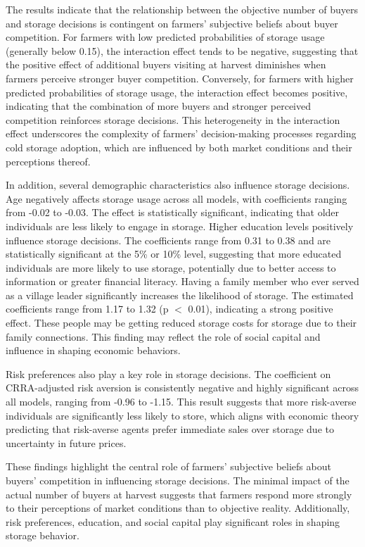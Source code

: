 \documentclass[12pt]{article}
\begin{document}
The results indicate that the relationship between the objective number of buyers and storage decisions is contingent on farmers' subjective beliefs about buyer competition. For farmers with low predicted probabilities of storage usage (generally below 0.15), the interaction effect tends to be negative, suggesting that the positive effect of additional buyers visiting at harvest diminishes when farmers perceive stronger buyer competition. Conversely, for farmers with higher predicted probabilities of storage usage, the interaction effect becomes positive, indicating that the combination of more buyers and stronger perceived competition reinforces storage decisions. This heterogeneity in the interaction effect underscores the complexity of farmers' decision-making processes regarding cold storage adoption, which are influenced by both market conditions and their perceptions thereof.

In addition, several demographic characteristics also influence storage decisions. Age negatively affects storage usage across all models, with coefficients ranging from -0.02 to -0.03. The effect is statistically significant, indicating that older individuals are less likely to engage in storage. Higher education levels positively influence storage decisions. The coefficients range from 0.31 to 0.38 and are statistically significant at the 5\% or 10\% level, suggesting that more educated individuals are more likely to use storage, potentially due to better access to information or greater financial literacy. Having a family member who ever served as a village leader significantly increases the likelihood of storage. The estimated coefficients range from 1.17 to 1.32 (p $<$ 0.01), indicating a strong positive effect. These people may be getting reduced storage costs for storage due to their family connections. This finding may reflect the role of social capital and influence in shaping economic behaviors.

Risk preferences also play a key role in storage decisions. The coefficient on CRRA-adjusted risk aversion is consistently negative and highly significant across all models, ranging from -0.96 to -1.15. This result suggests that more risk-averse individuals are significantly less likely to store, which aligns with economic theory predicting that risk-averse agents prefer immediate sales over storage due to uncertainty in future prices.

These findings highlight the central role of farmers' subjective beliefs about buyers' competition in influencing storage decisions. The minimal impact of the actual number of buyers at harvest suggests that farmers respond more strongly to their perceptions of market conditions than to objective reality. Additionally, risk preferences, education, and social capital play significant roles in shaping storage behavior.
\end{document}
